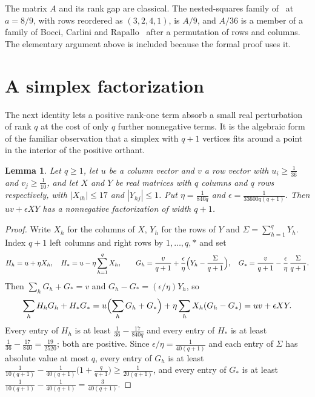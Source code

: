 \documentclass[11pt]{article}
\newtheorem{lemma}{Lemma}
\theoremstyle{remark}
\begin{document}
The matrix $A$ and its rank gap are classical. The nested-squares family of~\cite[\S6.1]{VGGT} at $a=8/9$, with rows reordered as $(3,2,4,1)$, is $A/9$, and $A/36$ is a member of a family of Bocci, Carlini and Rapallo~\cite{BCR} after a permutation of rows and columns. The elementary argument above is included because the formal proof uses it.

\section{A simplex factorization}\label{sec:simplex}

The next identity lets a positive rank-one term absorb a small real perturbation of rank $q$ at the cost of only $q$ further nonnegative terms. It is the algebraic form of the familiar observation that a simplex with $q+1$ vertices fits around a point in the interior of the positive orthant.

\begin{lemma}\label{lem:simplex}
Let $q\ge1$, let $u$ be a column vector and $v$ a row vector with $u_i\ge\frac{1}{36}$ and $v_j\ge\frac{1}{10}$, and let $X$ and $Y$ be real matrices with $q$ columns and $q$ rows respectively, with $|X_{ih}|\le17$ and $|Y_{hj}|\le1$. Put $\eta=\frac{1}{840q}$ and $\epsilon=\frac{1}{33600q(q+1)}$. Then $uv+\epsilon XY$ has a nonnegative factorization of width $q+1$.
\end{lemma}

\begin{proof}
Write $X_h$ for the columns of $X$, $Y_h$ for the rows of $Y$ and $\Sigma=\sum_{h=1}^qY_h$. Index $q+1$ left columns and right rows by $1,\dots,q,*$ and set
\[
H_h=u+\eta X_h,\quad H_*=u-\eta\sum_{h=1}^qX_h,\qquad
G_h=\frac{v}{q+1}+\frac{\epsilon}{\eta}\Bigl(Y_h-\frac{\Sigma}{q+1}\Bigr),\quad G_*=\frac{v}{q+1}-\frac{\epsilon}{\eta}\,\frac{\Sigma}{q+1}.
\]
Then $\sum_hG_h+G_*=v$ and $G_h-G_*=(\epsilon/\eta)Y_h$, so
\[
\sum_hH_hG_h+H_*G_*=u\Bigl(\sum_hG_h+G_*\Bigr)+\eta\sum_hX_h(G_h-G_*)=uv+\epsilon XY.
\]
Every entry of $H_h$ is at least $\frac{1}{36}-\frac{17}{840q}$ and every entry of $H_*$ is at least $\frac{1}{36}-\frac{17}{840}=\frac{19}{2520}$; both are positive. Since $\epsilon/\eta=\frac{1}{40(q+1)}$ and each entry of $\Sigma$ has absolute value at most $q$, every entry of $G_h$ is at least $\frac{1}{10(q+1)}-\frac{1}{40(q+1)}\bigl(1+\frac{q}{q+1}\bigr)\ge\frac{1}{20(q+1)}$, and every entry of $G_*$ is at least $\frac{1}{10(q+1)}-\frac{1}{40(q+1)}=\frac{3}{40(q+1)}$.
\end{proof}
\end{document}
